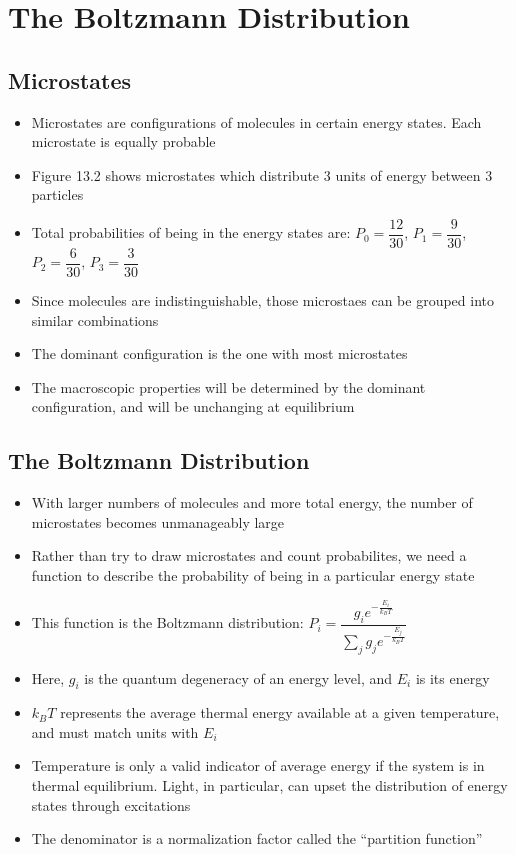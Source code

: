 \documentclass[12pt, openany, letterpaper]{memoir}
\begin{document}
\chapter{The Boltzmann Distribution}
\section*{Microstates}
\begin{itemize}
	\item Microstates are configurations of molecules in certain energy states. Each microstate is equally probable
	\item Figure 13.2 shows microstates which distribute 3 units of energy between 3 particles
	\item Total probabilities of being in the energy states are: $P_0=\dfrac{12}{30}$, $P_1=\dfrac{9}{30}$, $P_2=\dfrac{6}{30}$, $P_3=\dfrac{3}{30}$
	\item Since molecules are indistinguishable, those microstaes can be grouped into similar combinations
	\item The dominant configuration is the one with most microstates
	\item The macroscopic properties will be determined by the dominant configuration, and will be unchanging at equilibrium
\end{itemize}
\section*{The Boltzmann Distribution}
\begin{itemize}	
	\item With larger numbers of molecules and more total energy, the number of microstates becomes unmanageably large
	\item Rather than try to draw microstates and count probabilites, we need a function to describe the probability of being in a particular energy state
	\item This function is the Boltzmann distribution: $P_i = \dfrac{g_ie^{-\frac{E_i}{k_BT}}}{\sum\limits_j g_je^{-\frac{E_j}{k_BT}}}$
	\item Here, $g_i$ is the quantum degeneracy of an energy level, and $E_i$ is its energy
	\item $k_BT$ represents the average thermal energy available at a given temperature, and must match units with $E_i$
	\item Temperature is only a valid indicator of average energy if the system is in thermal equilibrium. Light, in particular, can upset the distribution of energy states through excitations
	\item The denominator is a normalization factor called the ``partition function''
\end{itemize}
\end{document}
